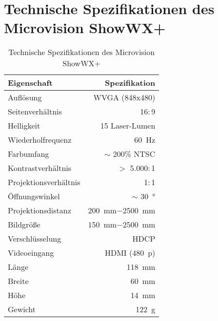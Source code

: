 \section{Technische Spezifikationen des Microvision ShowWX+}
\label{app:projector}
\begin{table}[!ht]
\begin{center}
\vspace{-3mm}
\begin{tabular}{|l|r|}
\hline
\rowcolor{lightgray} Eigenschaft & Spezifikation \\
\hline
Auflösung 	& WVGA (\SI{848}{}$\mathrm{x}$\SI{480}{}) \\
\hline
Seitenverhältnis & \SI{16}{}$:$\SI{9}{} \\
\hline
Helligkeit 	& \SI{15}{} Laser-Lumen \\
\hline
Wiederholfrequenz & \SI{60}{\Hz} \\
\hline
Farbumfang 	& $\sim$ \SI{200}{}\% NTSC \\
\hline
Kontrastverhältnis 	& $>$ \SI{5.000}{}$:$\SI{1}{} \\
\hline
Projektionsverhältnis 	& \SI{1}{}$:$\SI{1}{} \\
\hline
Öffnungswinkel & $\sim$ \SI{30}{°}\\
\hline
Projektionsdistanz 	& \SI{200}{\milli\meter}$-$\SI{2500}{\milli\meter} \\
\hline
Bildgröße 	& \SI{150}{\milli\meter}$-$\SI{2500}{\milli\meter} \\
\hline
Verschlüsselung 	& HDCP \\
\hline
Videoeingang & HDMI (\SI{480}{p}) \\
\hline
Länge & \SI{118}{\milli\meter}\\
\hline
Breite & \SI{60}{\milli\meter}\\
\hline
Höhe & \SI{14}{\milli\meter}\\
\hline
Gewicht 	& \SI{122}{\gram} \\
\hline
\end{tabular}
\caption{Technische Spezifikationen des Microvision ShowWX+}
\end{center}
\label{tab:landmarks_f1}
\end{table}



